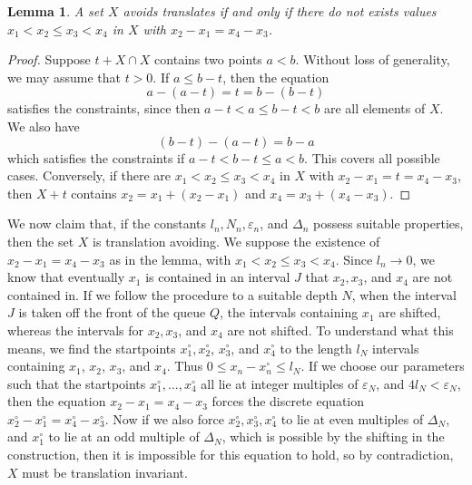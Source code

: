 \documentclass{report}
\theoremstyle{plain}
\newtheorem{lemma}{Lemma}
\theoremstyle{plain}
\begin{document}
\begin{lemma}
    A set $X$ avoids translates if and only if there do not exists values $x_1 < x_2 \leq x_3 < x_4$ in $X$ with $x_2 - x_1 = x_4 - x_3$.
\end{lemma}
\begin{proof}

    Suppose $t + X \cap X$ contains two points $a < b$. Without loss of generality, we may assume that $t > 0$. If $a \leq b - t$, then the equation
    \[ a - (a - t) = t = b - (b - t) \]
    satisfies the constraints, since then $a - t < a \leq b - t < b$ are all elements of $X$. We also have
    \[ (b - t) - (a - t) = b - a \]
    which satisfies the constraints if $a - t < b - t \leq a < b$. This covers all possible cases. Conversely, if there are $x_1 < x_2 \leq x_3 < x_4$ in $X$ with $x_2 - x_1 = t = x_4 - x_3$, then $X + t$ contains $x_2 = x_1 + (x_2 - x_1)$ and $x_4 = x_3 + (x_4 - x_3)$.
\end{proof}

We now claim that, if the constants $l_n, N_n, \varepsilon_n$, and $\Delta_n$ possess suitable properties, then the set $X$ is translation avoiding. We suppose the existence of $x_2 - x_1 = x_4 - x_3$ as in the lemma, with $x_1 < x_2 \leq x_3 < x_4$. Since $l_n \to 0$, we know that eventually $x_1$ is contained in an interval $J$ that $x_2,x_3$, and $x_4$ are not contained in. If we follow the procedure to a suitable depth $N$, when the interval $J$ is taken off the front of the queue $Q$, the intervals containing $x_1$ are shifted, whereas the intervals for $x_2,x_3$, and $x_4$ are not shifted. To understand what this means, we find the startpoints $x_1^\circ, x_2^\circ$, $x_3^\circ$, and $x_4^\circ$ to the length $l_N$ intervals containing $x_1$, $x_2$, $x_3$, and $x_4$. Thus $0 \leq x_n - x_n^\circ \leq l_N$. If we choose our parameters such that the startpoints $x_1^\circ, \dots, x_4^\circ$ all lie at integer multiples of $\varepsilon_N$, and $4l_N < \varepsilon_N$, then the equation $x_2 - x_1 = x_4 - x_3$ forces the discrete equation $x_2^\circ - x_1^\circ = x_4^\circ - x_3^\circ$. Now if we also force $x_2^\circ, x_3^\circ, x_4^\circ$ to lie at even multiples of $\Delta_N$, and $x_1^\circ$ to lie at an odd multiple of $\Delta_N$, which is possible by the shifting in the construction, then it is impossible for this equation to hold, so by contradiction, $X$ must be translation invariant.
\end{document}
